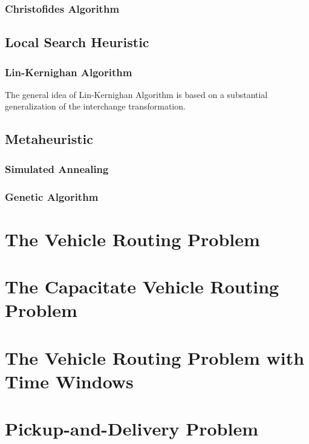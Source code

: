 				\subsection{Christofides Algorithm}

			\section{Local Search Heuristic}
				\subsection{Lin-Kernighan Algorithm}
					The general idea of Lin-Kernighan Algorithm is based on a substantial generalization of the interchange transformation.

			\section{Metaheuristic}
				\subsection{Simulated Annealing}

				\subsection{Genetic Algorithm}


		\chapter{The Vehicle Routing Problem}

		\chapter{The Capacitate Vehicle Routing Problem}

		\chapter{The Vehicle Routing Problem with Time Windows}

		\chapter{Pickup-and-Delivery Problem}\label{chp:PDP}
